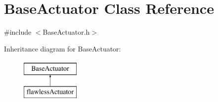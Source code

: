 \hypertarget{class_base_actuator}{}\section{Base\+Actuator Class Reference}
\label{class_base_actuator}


{\ttfamily \#include $<$Base\+Actuator.\+h$>$}

Inheritance diagram for Base\+Actuator\+:\begin{figure}[H]
\begin{center}
\leavevmode
\includegraphics[height=2.000000cm]{class_base_actuator}
\end{center}
\end{figure}
